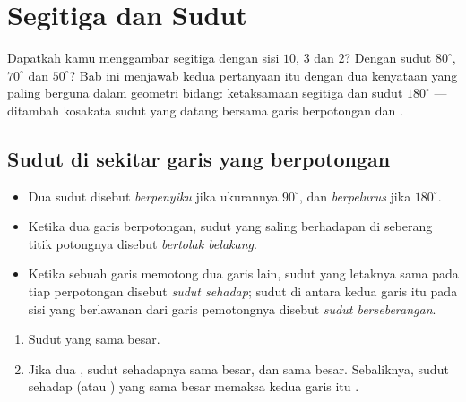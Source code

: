 \chapter{Segitiga dan Sudut}\label{ch:g7:triangles}

Dapatkah kamu menggambar segitiga dengan sisi $10$, $3$ dan $2$?
Dengan sudut $80^\circ$, $70^\circ$ dan $50^\circ$? Bab ini menjawab
kedua pertanyaan itu dengan dua kenyataan yang paling berguna dalam
geometri bidang: ketaksamaan segitiga dan  sudut $180^\circ$ ---
ditambah kosakata sudut yang datang bersama garis berpotongan dan
.

\section{Sudut di sekitar garis yang berpotongan}

\begin{definition}\label{def:g7:triangles:pairs}
\begin{itemize}
  \item Dua sudut disebut \emph{berpenyiku} jika  ukurannya
        $90^\circ$, dan \emph{berpelurus} jika 
        $180^\circ$.
  \item Ketika dua garis berpotongan, sudut yang saling berhadapan di
        seberang titik potongnya disebut \emph{bertolak
        belakang}.
  \item Ketika sebuah garis memotong dua garis lain, sudut yang
        letaknya sama pada tiap perpotongan disebut
        \emph{sudut sehadap}; sudut di antara kedua garis itu pada
        sisi yang berlawanan dari garis pemotongnya disebut
        \emph{sudut berseberangan}.
\end{itemize}
\end{definition}

\begin{theorem}\label{thm:g7:triangles:equalities}
\begin{enumerate}
  \item Sudut yang  sama besar.
  \item Jika dua , sudut sehadapnya sama besar, dan
         sama besar. Sebaliknya, sudut sehadap
        (atau ) yang sama besar memaksa kedua garis
        itu .
\end{enumerate}
\end{theorem}

